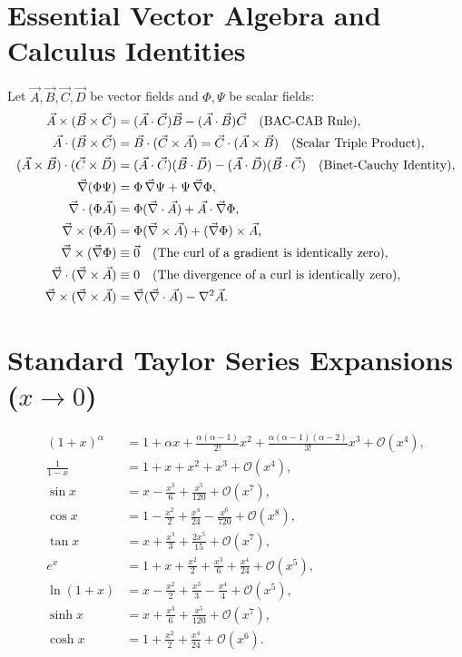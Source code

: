 \section{Essential Vector Algebra and Calculus Identities}

Let $\vec{A}, \vec{B}, \vec{C}, \vec{D}$ be vector fields and $\Phi, \Psi$ be scalar fields:
\begin{align}
\vec{A} \times (\vec{B} \times \vec{C}) &= (\vec{A} \cdot \vec{C})\vec{B} - (\vec{A} \cdot \vec{B})\vec{C} \quad \text{(BAC-CAB Rule)}, \\
\vec{A} \cdot (\vec{B} \times \vec{C}) &= \vec{B} \cdot (\vec{C} \times \vec{A}) = \vec{C} \cdot (\vec{A} \times \vec{B}) \quad \text{(Scalar Triple Product)}, \\
(\vec{A} \times \vec{B}) \cdot (\vec{C} \times \vec{D}) &= (\vec{A} \cdot \vec{C})(\vec{B} \cdot \vec{D}) - (\vec{A} \cdot \vec{D})(\vec{B} \cdot \vec{C}) \quad \text{(Binet-Cauchy Identity)}, \\
\vec{\nabla}(\Phi\Psi) &= \Phi\,\vec{\nabla}\Psi + \Psi\,\vec{\nabla}\Phi, \\
\vec{\nabla} \cdot (\Phi\vec{A}) &= \Phi(\vec{\nabla}\cdot\vec{A}) + \vec{A}\cdot\vec{\nabla}\Phi, \\
\vec{\nabla} \times (\Phi\vec{A}) &= \Phi(\vec{\nabla}\times\vec{A}) + (\vec{\nabla}\Phi)\times\vec{A}, \\
\vec{\nabla} \times (\vec{\nabla}\Phi) &\equiv \vec{0} \quad \text{(The curl of a gradient is identically zero)}, \\
\vec{\nabla} \cdot (\vec{\nabla}\times\vec{A}) &\equiv 0 \quad \text{(The divergence of a curl is identically zero)}, \\
\vec{\nabla} \times (\vec{\nabla}\times\vec{A}) &= \vec{\nabla}(\vec{\nabla}\cdot\vec{A}) - \nabla^2\vec{A}.
\end{align}

\section{Standard Taylor Series Expansions ($x \to 0$)}

\begin{align}
(1 + x)^\alpha &= 1 + \alpha x + \frac{\alpha(\alpha-1)}{2!} x^2 + \frac{\alpha(\alpha-1)(\alpha-2)}{3!} x^3 + \mathcal{O}(x^4), \\
\frac{1}{1 - x} &= 1 + x + x^2 + x^3 + \mathcal{O}(x^4), \\
\sin x &= x - \frac{x^3}{6} + \frac{x^5}{120} + \mathcal{O}(x^7), \\
\cos x &= 1 - \frac{x^2}{2} + \frac{x^4}{24} - \frac{x^6}{720} + \mathcal{O}(x^8), \\
\tan x &= x + \frac{x^3}{3} + \frac{2x^5}{15} + \mathcal{O}(x^7), \\
e^x &= 1 + x + \frac{x^2}{2} + \frac{x^3}{6} + \frac{x^4}{24} + \mathcal{O}(x^5), \\
\ln(1 + x) &= x - \frac{x^2}{2} + \frac{x^3}{3} - \frac{x^4}{4} + \mathcal{O}(x^5), \\
\sinh x &= x + \frac{x^3}{6} + \frac{x^5}{120} + \mathcal{O}(x^7), \\
\cosh x &= 1 + \frac{x^2}{2} + \frac{x^4}{24} + \mathcal{O}(x^6).
\end{align}
